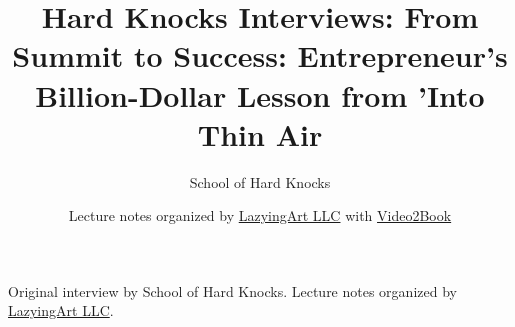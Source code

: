 \documentclass[11pt,oneside]{book}
\begin{document}
\frontmatter
\title{Hard Knocks Interviews: From Summit to Success: Entrepreneur's Billion-Dollar Lesson from 'Into Thin Air}
\author{School of Hard Knocks}
\date{Lecture notes organized by \href{https://lazying.art}{LazyingArt LLC} with \href{https://github.com/lachlanchen/Video2Book}{Video2Book}}
\maketitle
\begin{center}
\small Original interview by School of Hard Knocks. Lecture notes organized by \href{https://lazying.art}{LazyingArt LLC}.
\end{center}
\clearpage
\mainmatter

\end{document}
